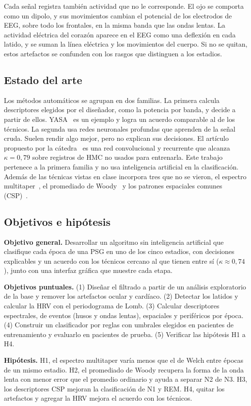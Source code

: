 Cada señal registra también actividad que no le corresponde. El ojo se comporta como un dipolo, y sus movimientos cambian el potencial de los electrodos de EEG, sobre todo los frontales, en la misma banda que las ondas lentas. La actividad eléctrica del corazón aparece en el EEG como una deflexión en cada latido, y se suman la línea eléctrica y los movimientos del cuerpo. Si no se quitan, estos artefactos se confunden con los rasgos que distinguen a los estadios.

\subsection{Estado del arte}
Los métodos automáticos se agrupan en dos familias. La primera calcula descriptores elegidos por el diseñador, como la potencia por banda, y decide a partir de ellos. YASA~\cite{vallat2021} es un ejemplo y logra un acuerdo comparable al de los técnicos. La segunda usa redes neuronales profundas que aprenden de la señal cruda. Suelen rendir algo mejor, pero no explican sus decisiones. El artículo propuesto por la cátedra~\cite{alvarez2021} es una red convolucional y recurrente que alcanza $\kappa = 0{,}79$ sobre registros de HMC no usados para entrenarla. Este trabajo pertenece a la primera familia y no usa inteligencia artificial en la clasificación. Además de las técnicas vistas en clase incorpora tres que no se vieron, el espectro multitaper~\cite{thomson1982,prerau2017}, el promediado de Woody~\cite{woody1967} y los patrones espaciales comunes (CSP)~\cite{ramoser2000}.

\subsection{Objetivos e hipótesis}
\textbf{Objetivo general.} Desarrollar un algoritmo sin inteligencia artificial que clasifique cada época de una PSG en uno de los cinco estadios, con decisiones explicables y un acuerdo con los técnicos cercano al que tienen entre sí ($\kappa \approx 0{,}74$), junto con una interfaz gráfica que muestre cada etapa.

\textbf{Objetivos puntuales.} (1) Diseñar el filtrado a partir de un análisis exploratorio de la base y remover los artefactos ocular y cardíaco. (2) Detectar los latidos y calcular la HRV con el periodograma de Lomb. (3) Calcular descriptores espectrales, de eventos (husos y ondas lentas), espaciales y periféricos por época. (4) Construir un clasificador por reglas con umbrales elegidos en pacientes de entrenamiento y evaluarlo en pacientes de prueba. (5) Verificar las hipótesis H1 a H4.

\textbf{Hipótesis.} H1, el espectro multitaper varía menos que el de Welch entre épocas de un mismo estadio. H2, el promediado de Woody recupera la forma de la onda lenta con menor error que el promedio ordinario y ayuda a separar N2 de N3. H3, los descriptores CSP mejoran la clasificación de N1 y REM. H4, quitar los artefactos y agregar la HRV mejora el acuerdo con los técnicos.
